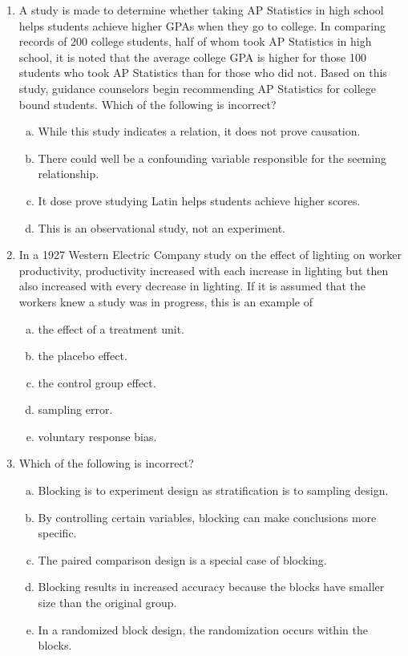 \documentclass[a4paper,12pt,twoside]{book}
\begin{document}
\begin{enumerate}
    \item A study is made to determine whether taking AP Statistics in high school helps students achieve higher GPAs when they go to college. In comparing records of 200 college students, half of whom took AP Statistics in high school, it is noted that the average college GPA is higher for those 100 students who took AP Statistics than for those who did not. Based on this study, guidance counselors begin recommending AP Statistics for college bound students. Which of the following is incorrect?
    \begin{enumerate}[(a)]
        \item While this study indicates a relation, it does not prove causation.
        \item There could well be a confounding variable responsible for the seeming relationship.
        \item It dose prove studying Latin helps students achieve higher scores.
        \item This is an observational study, not an experiment.
    \end{enumerate}  
    
 \item In a 1927 Western Electric Company study on the effect of lighting on worker productivity, productivity increased with each increase in lighting but then also increased with every decrease in lighting. If it is assumed that the workers knew a study was in progress, this is an example of
    \begin{enumerate}[(a)]
        \item   the effect of a treatment unit.
        \item the placebo effect.
        \item the control group effect.
        \item sampling error.
        \item voluntary response bias.
    \end{enumerate}
        
 \item Which of the following is incorrect?
     \begin{enumerate}[(a)]
         \item Blocking is to experiment design as stratification is to sampling design.
         \item  By controlling certain variables, blocking can make conclusions more specific.
         \item The paired comparison design is a special case of blocking.
         \item Blocking results in increased accuracy because the blocks have smaller size than the original group.
         \item In a randomized block design, the randomization occurs within the blocks.
     \end{enumerate}            
        

\end{enumerate}
\end{document}
